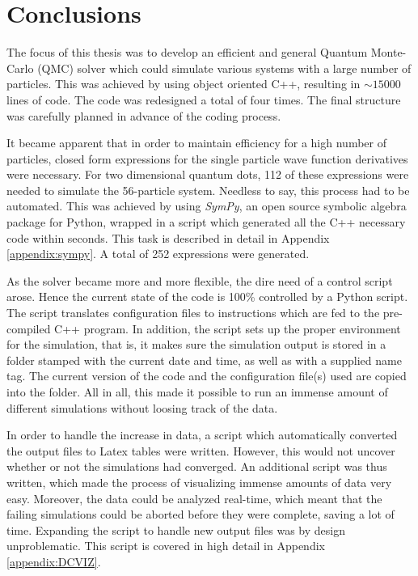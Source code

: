 \chapter{Conclusions}

The focus of this thesis was to develop an efficient and general Quantum Monte-Carlo (QMC) solver which could simulate various systems with a large number of particles. This was achieved by using object oriented C++, resulting in $\sim15000$ lines of code. The code was redesigned a total of four times. The final structure was carefully planned in advance of the coding process.

It became apparent that in order to maintain efficiency for a high number of particles, closed form expressions for the single particle wave function derivatives were necessary. For two dimensional quantum dots, 112 of these expressions were needed to simulate the 56-particle system. Needless to say, this process had to be automated. This was achieved by using \textit{SymPy}, an open source symbolic algebra package for Python, wrapped in a script which generated all the C++ necessary code within seconds. This task is described in detail in Appendix \ref{appendix:sympy}. A total of 252 expressions were generated.

As the solver became more and more flexible, the dire need of a control script arose. Hence the current state of the code is 100\% controlled by a Python script. The script translates configuration files to instructions which are fed to the pre-compiled C++ program. In addition, the script sets up the proper environment for the simulation, that is, it makes sure the simulation output is stored in a folder stamped with the current date and time, as well as with a supplied name tag. The current version of the code and the configuration file(s) used are copied into the folder. All in all, this made it possible to run an immense amount of different simulations without loosing track of the data.

In order to handle the increase in data, a script which automatically converted the output files to Latex tables were written. However, this would not uncover whether or not the simulations had converged. An additional script was thus written, which made the process of visualizing immense amounts of data very easy. Moreover, the data could be analyzed real-time, which meant that the failing simulations could be aborted before they were complete, saving a lot of time. Expanding the script to handle new output files was by design unproblematic. This script is covered in high detail in Appendix \ref{appendix:DCVIZ}.

